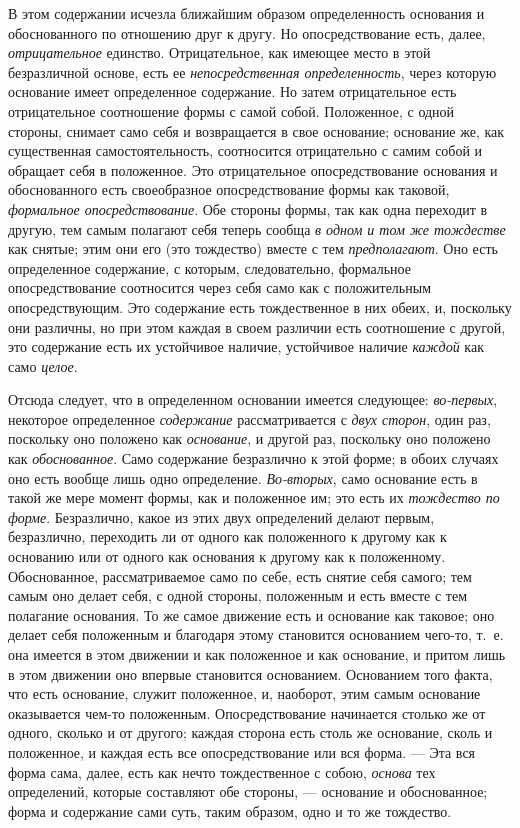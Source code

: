 В этом содержании исчезла ближайшим образом определенность основания и
обоснованного по отношению друг к другу. Но опосредствование есть, далее,
{\em отрицательное} единство. Отрицательное, как
имеющее место в этой безразличной основе, есть ее
{\em непосредственная определенность}, через которую
основание имеет определенное содержание. Но затем отрицательное есть
отрицательное соотношение формы с самой собой. Положенное, с одной стороны,
снимает само себя и возвращается в свое основание; основание же, как
существенная самостоятельность, соотносится отрицательно с самим собой и
обращает себя в положенное. Это отрицательное опосредствование основания и
обоснованного есть своеобразное опосредствование формы как таковой,
{\em формальное опосредствование}. Обе стороны формы,
так как одна переходит в другую, тем самым полагают себя теперь сообща
{\em в одном и том же тождестве} как снятые; этим они
его (это тождество) вместе с тем {\em предполагают}.
Оно есть определенное содержание, с которым, следовательно, формальное
опосредствование соотносится через себя само как с положительным
опосредствующим. Это содержание есть тождественное в них обеих, и,
поскольку они различны, но при этом каждая в своем различии есть
соотношение с другой, это содержание есть их устойчивое наличие, устойчивое
наличие {\em каждой} как само
{\em целое}.

Отсюда следует, что в определенном основании имеется следующее:
{\em во-первых}, некоторое определенное
{\em содержание} рассматривается с
{\em двух сторон}, один раз, поскольку оно положено как
{\em основание}, и другой раз, поскольку оно положено
как {\em обоснованное}. Само содержание безразлично к
этой форме; в обоих случаях оно есть вообще лишь одно определение.
{\em Во-вторых}, само основание есть в такой же мере
момент формы, как и положенное им; это есть их
{\em тождество по форме}. Безразлично, какое из этих
двух определений делают первым, безразлично, переходить ли от одного как
положенного к другому как к основанию или от одного как основания к другому
как к положенному. Обоснованное, рассматриваемое само по себе, есть снятие
себя самого; тем самым оно делает себя, с одной стороны, положенным и есть
вместе с тем полагание основания. То же самое движение есть и основание как
таковое; оно делает себя положенным и благодаря этому становится основанием
чего-то, т.~е. она имеется в этом движении и как положенное и как
основание, и притом лишь в этом движении оно впервые становится основанием.
Основанием того факта, что есть основание, служит положенное, и, наоборот,
этим самым основание оказывается чем-то положенным. Опосредствование
начинается столько же от одного, сколько и от другого; каждая сторона есть
столь же основание, сколь и положенное, и каждая есть все опосредствование
или вся форма. — Эта вся форма сама, далее, есть как нечто тождественное с
собою, {\em основа} тех определений, которые составляют
обе стороны, — основание и обоснованное; форма и содержание сами суть,
таким образом, одно и то же тождество.

